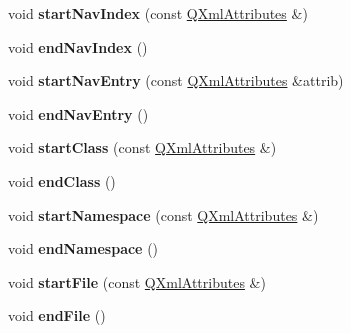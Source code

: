 \begin{DoxyCompactItemize}
\item 
\hypertarget{class_layout_parser_abf33001024bdcf7aec88f3c31ed7d8ef}{void {\bfseries start\-Nav\-Index} (const \hyperlink{class_q_xml_attributes}{Q\-Xml\-Attributes} \&)}\label{class_layout_parser_abf33001024bdcf7aec88f3c31ed7d8ef}

\item 
\hypertarget{class_layout_parser_a0eaa5b06c83a36b36ec04c32223aded9}{void {\bfseries end\-Nav\-Index} ()}\label{class_layout_parser_a0eaa5b06c83a36b36ec04c32223aded9}

\item 
\hypertarget{class_layout_parser_aed0acf3c875810d4052f268dee99ea95}{void {\bfseries start\-Nav\-Entry} (const \hyperlink{class_q_xml_attributes}{Q\-Xml\-Attributes} \&attrib)}\label{class_layout_parser_aed0acf3c875810d4052f268dee99ea95}

\item 
\hypertarget{class_layout_parser_ae63c7ce549b9d00662dd79269b92614b}{void {\bfseries end\-Nav\-Entry} ()}\label{class_layout_parser_ae63c7ce549b9d00662dd79269b92614b}

\item 
\hypertarget{class_layout_parser_a72880c3a880f15cb86e940cf4d1a0328}{void {\bfseries start\-Class} (const \hyperlink{class_q_xml_attributes}{Q\-Xml\-Attributes} \&)}\label{class_layout_parser_a72880c3a880f15cb86e940cf4d1a0328}

\item 
\hypertarget{class_layout_parser_a20c59e445095d01be3716c04bfadb73a}{void {\bfseries end\-Class} ()}\label{class_layout_parser_a20c59e445095d01be3716c04bfadb73a}

\item 
\hypertarget{class_layout_parser_a92ab470ceeef96f5188c648e5837463d}{void {\bfseries start\-Namespace} (const \hyperlink{class_q_xml_attributes}{Q\-Xml\-Attributes} \&)}\label{class_layout_parser_a92ab470ceeef96f5188c648e5837463d}

\item 
\hypertarget{class_layout_parser_a911c2a5aab798e0531c2a5757f90a88c}{void {\bfseries end\-Namespace} ()}\label{class_layout_parser_a911c2a5aab798e0531c2a5757f90a88c}

\item 
\hypertarget{class_layout_parser_ad3719b9668399533a6f2cf41bef67501}{void {\bfseries start\-File} (const \hyperlink{class_q_xml_attributes}{Q\-Xml\-Attributes} \&)}\label{class_layout_parser_ad3719b9668399533a6f2cf41bef67501}

\item 
\hypertarget{class_layout_parser_a91124168a972dfb54e63eb80980bd7c4}{void {\bfseries end\-File} ()}\label{class_layout_parser_a91124168a972dfb54e63eb80980bd7c4}


\end{DoxyCompactItemize}
